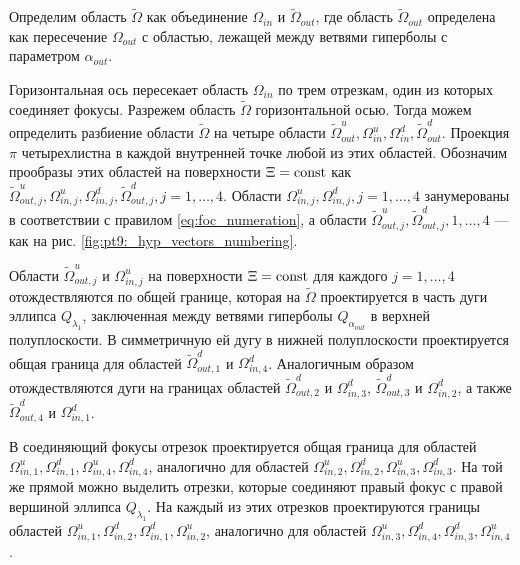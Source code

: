 Определим область $\widetilde{\Omega}$  как объединение $\Omega_{in}$ и $\widetilde{\Omega}_{out}$, где область $\widetilde{\Omega}_{out}$ определена как пересечение $\Omega_{out}$ с областью, лежащей  между ветвями гиперболы с параметром $\alpha_{out}$. 

Горизонтальная ось пересекает область $\Omega_{in}$ по трем отрезкам, один из которых соединяет фокусы. Разрежем область $\widetilde{\Omega}$ горизонтальной осью. 
Тогда можем определить разбиение области $\widetilde{\Omega}$ на четыре области 
$\widetilde{\Omega}_{out}^u, \Omega_{in}^u, \Omega_{in}^d, \widetilde{\Omega}_{out}^d$. 
Проекция $\pi$ четырехлистна в каждой  внутренней точке любой из этих областей. Обозначим прообразы этих областей на поверхности $\Xi = \mathrm{const}$ как 
$\widetilde{\Omega}_{out,j}^u, \Omega_{in, j}^u, \Omega_{in, j}^d, \widetilde{\Omega}_{out, j}^d, j=1, \ldots, 4$.
Области $\Omega_{in, j}^u, \Omega_{in, j}^d, j=1,\ldots,4$ занумерованы в соответствии с правилом \eqref{eq:foc_numeration}, а области $\widetilde{\Omega}_{out,j}^u, \widetilde{\Omega}_{out, j}^d, 1, \ldots, 4$ --- как на рис. \ref{fig:pt9:_hyp_vectors_numbering}.

Области $\widetilde{\Omega}_{out,j}^u$ и $\Omega_{in, j}^u$ на поверхности $\Xi = \mathrm{const}$ для каждого $j=1, \ldots, 4$ отождествляются по общей границе, которая на $\widetilde{\Omega}$ проектируется в часть дуги эллипса $Q_{\lambda_1}$, заключенная между ветвями гиперболы $Q_{\alpha_{out}}$ в верхней полуплоскости. В симметричную ей дугу в нижней полуплоскости проектируется общая граница для областей $\widetilde{\Omega}_{out,1}^d$ и $\Omega_{in, 4}^d$. Аналогичным образом отождествляются дуги на границах областей $\widetilde{\Omega}_{out,2}^d$ и $\Omega_{in, 3}^d$, $\widetilde{\Omega}_{out,3}^d$ и $\Omega_{in, 2}^d$, а также $\widetilde{\Omega}_{out,4}^d$ и $\Omega_{in, 1}^d$.

В соединяющий фокусы отрезок проектируется общая граница для областей $\Omega_{in, 1}^u, \Omega_{in, 1}^d, \Omega_{in, 4}^u, \Omega_{in, 4}^d$, аналогично для областей $\Omega_{in, 2}^u, \Omega_{in, 2}^d, \Omega_{in, 3}^u, \Omega_{in, 3}^d$.
На той же прямой можно выделить отрезки, которые соединяют правый фокус с правой вершиной эллипса $Q_{\lambda_1}$. На каждый из этих отрезков проектируются границы областей $\Omega_{in, 1}^u, \Omega_{in, 2}^d, \Omega_{in, 1}^d, \Omega_{in, 2}^u$, аналогично для областей $\Omega_{in, 3}^u, \Omega_{in, 4}^d, \Omega_{in, 3}^d, \Omega_{in, 4}^u$.

